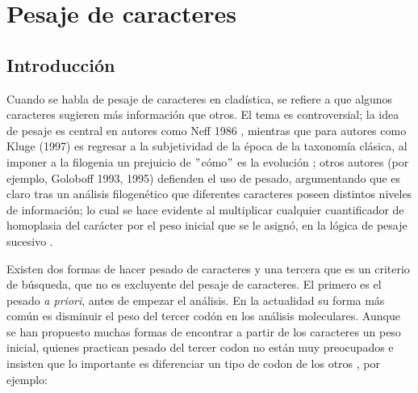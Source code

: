 \chapter{Pesaje de caracteres}
\section*{Introducci\'on}
Cuando se habla de pesaje de caracteres en clad\'istica, se refiere a que algunos caracteres sugieren m\'as informaci\'on que otros. El tema es controversial;
la idea de pesaje es central en autores como  Neff 1986 \cite{Neff1986}, mientras que para autores como  Kluge (1997) es regresar a la subjetividad de la \'epoca de la taxonom\'ia cl\'asica, al imponer a la filogenia un prejuicio de $"$c\'omo$"$ es la evoluci\'on \cite{Kluge1997}; 
otros autores (por ejemplo, Goloboff 1993, 1995) \cite{Goloboff1993} \cite{Goloboff1995} defienden el uso de pesado, argumentando que es claro tras un an\'alisis filogen\'etico que diferentes caracteres poseen distintos niveles de  informaci\'on; lo cual se hace evidente al multiplicar cualquier cuantificador de homoplasia del car\'acter por el peso inicial que se le asign\'o, en la l\'ogica de pesaje sucesivo \cite{Kluge1969}.


Existen dos formas de hacer pesado de caracteres y una tercera que es un criterio de b\'usqueda, que no es  excluyente del pesaje de caracteres. El primero es el pesado \textit{a priori}, antes de empezar el an\'alisis. 
En la actualidad su forma m\'as com\'un es disminuir el peso del tercer cod\'on en los an\'alisis moleculares. Aunque se han propuesto muchas formas de encontrar a partir de los caracteres un peso inicial, quienes practican pesado del tercer codon no est\'an muy preocupados e insisten que lo importante es diferenciar un tipo de codon de los otros \cite{Swofford1996}, por ejemplo:

% 

